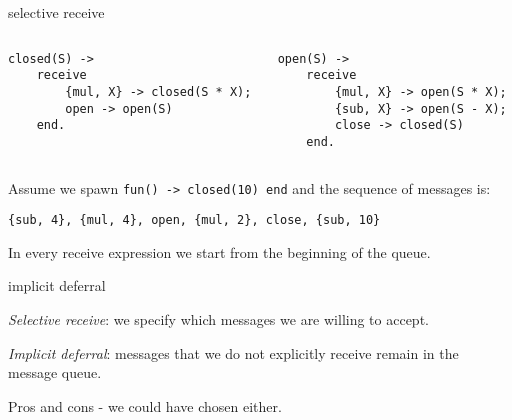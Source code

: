 \begin{frame}[fragile]{selective receive}

\begin{columns}
 \begin{column}{0.5\linewidth}
\begin{verbatim}
closed(S) ->
    receive 
        {mul, X} -> closed(S * X);
        open -> open(S)
    end.
\end{verbatim}
 \end{column}
\pause
 \begin{column}{0.5\linewidth}
\begin{verbatim}
open(S) ->
    receive 
        {mul, X} -> open(S * X);
        {sub, X} -> open(S - X);
        close -> closed(S)
    end.
\end{verbatim}
 \end{column}
\end{columns}


\pause\vspace{10pt}

Assume we spawn {\tt fun() -> closed(10) end} and the sequence of messages is:

\vspace{10pt}

{\tt \{sub, 4\}, \{mul, 4\}, open, \{mul, 2\}, close, \{sub, 10\}}

\pause\vspace{10pt}

In every receive expression we start from the beginning of the queue.

\end{frame}


\begin{frame}{implicit deferral}

{\em Selective receive}: we specify which messages we are willing to accept.

{\em Implicit deferral}: messages that we do not explicitly receive remain in the message queue.

\pause\vspace{10pt}

Pros and cons - we could have chosen either.

\end{frame}


